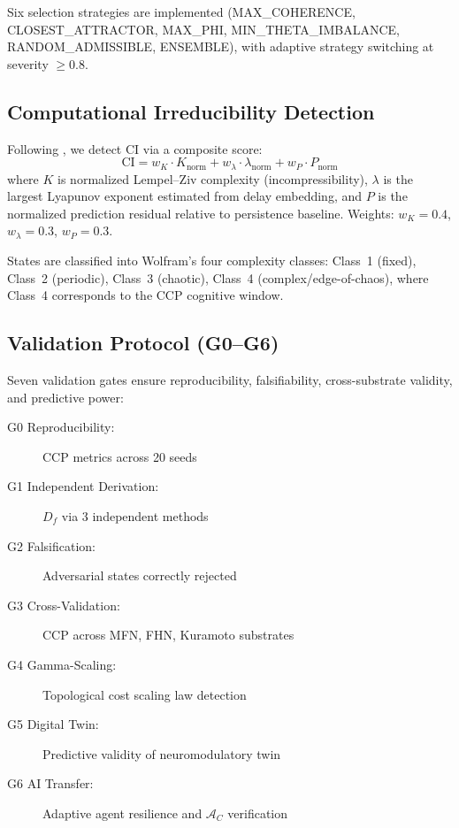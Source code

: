 \documentclass[10pt,letterpaper]{article}
\begin{document}
Six selection strategies are implemented (MAX\_COHERENCE,
CLOSEST\_ATTRACTOR, MAX\_PHI, MIN\_THETA\_IMBALANCE,
RANDOM\_ADMISSIBLE, ENSEMBLE), with adaptive strategy switching
at severity $\geq 0.8$.

\subsection{Computational Irreducibility Detection}

Following \citet{wolfram2002}, we detect CI via a composite score:
\begin{equation}
  \text{CI} = w_K \cdot K_{\text{norm}} + w_\lambda \cdot \lambda_{\text{norm}}
  + w_P \cdot P_{\text{norm}}
\end{equation}
where $K$ is normalized Lempel--Ziv complexity (incompressibility),
$\lambda$ is the largest Lyapunov exponent estimated from delay
embedding, and $P$ is the normalized prediction residual relative
to persistence baseline. Weights: $w_K = 0.4$, $w_\lambda = 0.3$,
$w_P = 0.3$.

States are classified into Wolfram's four complexity classes:
Class~1 (fixed), Class~2 (periodic), Class~3 (chaotic),
Class~4 (complex/edge-of-chaos), where Class~4 corresponds to
the CCP cognitive window.

\subsection{Validation Protocol (G0--G6)}

Seven validation gates ensure reproducibility, falsifiability,
cross-substrate validity, and predictive power:

\begin{description}
  \item[G0 Reproducibility:] CCP metrics across 20 seeds
  \item[G1 Independent Derivation:] $D_f$ via 3 independent methods
  \item[G2 Falsification:] Adversarial states correctly rejected
  \item[G3 Cross-Validation:] CCP across MFN, FHN, Kuramoto substrates
  \item[G4 Gamma-Scaling:] Topological cost scaling law detection
  \item[G5 Digital Twin:] Predictive validity of neuromodulatory twin
  \item[G6 AI Transfer:] Adaptive agent resilience and $\mathcal{A}_C$
    verification
\end{description}
\end{document}
